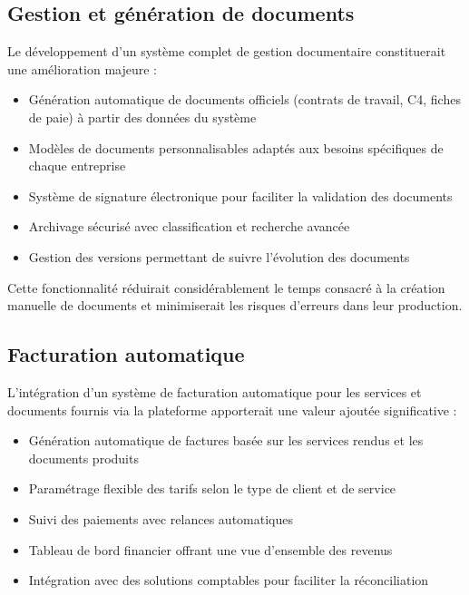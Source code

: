 \subsection*{Gestion et génération de documents}

Le développement d'un système complet de gestion documentaire constituerait une amélioration majeure :

\begin{itemize}[leftmargin=*,label=\textcolor{darkgray}{$\bullet$},itemsep=0.3em]
  \item Génération automatique de documents officiels (contrats de travail, C4, fiches de paie) à partir des données du système
  \item Modèles de documents personnalisables adaptés aux besoins spécifiques de chaque entreprise
  \item Système de signature électronique pour faciliter la validation des documents
  \item Archivage sécurisé avec classification et recherche avancée
  \item Gestion des versions permettant de suivre l'évolution des documents
\end{itemize}

Cette fonctionnalité réduirait considérablement le temps consacré à la création manuelle de documents et minimiserait les risques d'erreurs dans leur production.

\subsection*{Facturation automatique}

L'intégration d'un système de facturation automatique pour les services et documents fournis via la plateforme apporterait une valeur ajoutée significative :

\begin{itemize}[leftmargin=*,label=\textcolor{darkgray}{$\bullet$},itemsep=0.3em]
  \item Génération automatique de factures basée sur les services rendus et les documents produits
  \item Paramétrage flexible des tarifs selon le type de client et de service
  \item Suivi des paiements avec relances automatiques
  \item Tableau de bord financier offrant une vue d'ensemble des revenus
  \item Intégration avec des solutions comptables pour faciliter la réconciliation
\end{itemize}

